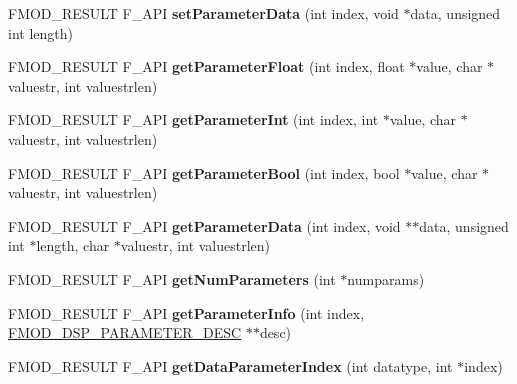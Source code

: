 \begin{DoxyCompactItemize}
\item 
\mbox{\label{classFMOD_1_1DSP_a9faf74d474b3c55f149830745e03d6a7}} 
F\+M\+O\+D\+\_\+\+R\+E\+S\+U\+LT F\+\_\+\+A\+PI {\bfseries set\+Parameter\+Data} (int index, void $\ast$data, unsigned int length)
\item 
\mbox{\label{classFMOD_1_1DSP_a9c39fc71ec08a47344defe07594ccb80}} 
F\+M\+O\+D\+\_\+\+R\+E\+S\+U\+LT F\+\_\+\+A\+PI {\bfseries get\+Parameter\+Float} (int index, float $\ast$value, char $\ast$valuestr, int valuestrlen)
\item 
\mbox{\label{classFMOD_1_1DSP_a3ec0a889d95b1ebc5bff08d78fc13587}} 
F\+M\+O\+D\+\_\+\+R\+E\+S\+U\+LT F\+\_\+\+A\+PI {\bfseries get\+Parameter\+Int} (int index, int $\ast$value, char $\ast$valuestr, int valuestrlen)
\item 
\mbox{\label{classFMOD_1_1DSP_addad4ecd4b44b59492d93be8e78e23dd}} 
F\+M\+O\+D\+\_\+\+R\+E\+S\+U\+LT F\+\_\+\+A\+PI {\bfseries get\+Parameter\+Bool} (int index, bool $\ast$value, char $\ast$valuestr, int valuestrlen)
\item 
\mbox{\label{classFMOD_1_1DSP_aea796a0521ef8fd6027f8683bcf4c879}} 
F\+M\+O\+D\+\_\+\+R\+E\+S\+U\+LT F\+\_\+\+A\+PI {\bfseries get\+Parameter\+Data} (int index, void $\ast$$\ast$data, unsigned int $\ast$length, char $\ast$valuestr, int valuestrlen)
\item 
\mbox{\label{classFMOD_1_1DSP_aba45842920caedf11c614d77aa028ab3}} 
F\+M\+O\+D\+\_\+\+R\+E\+S\+U\+LT F\+\_\+\+A\+PI {\bfseries get\+Num\+Parameters} (int $\ast$numparams)
\item 
\mbox{\label{classFMOD_1_1DSP_a09d63f638fc2af4dfeed6e2ff03246a5}} 
F\+M\+O\+D\+\_\+\+R\+E\+S\+U\+LT F\+\_\+\+A\+PI {\bfseries get\+Parameter\+Info} (int index, \hyperlink{structFMOD__DSP__PARAMETER__DESC}{F\+M\+O\+D\+\_\+\+D\+S\+P\+\_\+\+P\+A\+R\+A\+M\+E\+T\+E\+R\+\_\+\+D\+E\+SC} $\ast$$\ast$desc)
\item 
\mbox{\label{classFMOD_1_1DSP_a68024a75eddd65053f75a803360ad116}} 
F\+M\+O\+D\+\_\+\+R\+E\+S\+U\+LT F\+\_\+\+A\+PI {\bfseries get\+Data\+Parameter\+Index} (int datatype, int $\ast$index)

\end{DoxyCompactItemize}

